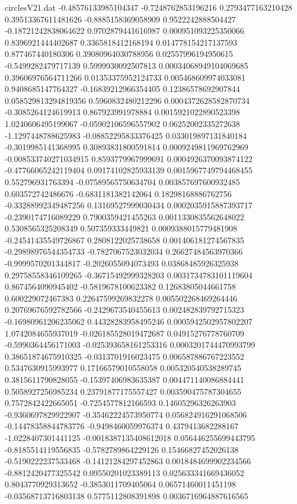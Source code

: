\begin{filecontents}{circlesV21.dat}
-0.48576133985104347	-0.7248762853196216	0.2793477163210428
0.39513367611481626	-0.8885158369058909	0.9522242888504427
-0.18721242838064622	0.9702879441616987	0.000951093225350066
0.8396921444402687	0.3365818412168194	0.014778154217137593
0.877467440180306	0.39080964030788956	0.02557996194950615
-0.5499282479717139	0.5999930092507813	0.00034068949104069685
0.39606976564711266	0.01353375952124733	0.005468609974033081
0.9408685147764327	-0.16839212966354405	0.12386578692907844
0.058529813294819356	0.5960832480212296	0.0004372628582870734
-0.3085264124619913	0.867923991978884	0.0015921022890523398
1.0240606495199067	-0.05902106596557902	0.06252002335272638
-1.1297448788625983	-0.08852295833376425	0.033019897131840184
-0.3019985141368995	0.30893831800591814	0.0009249811969762969
-0.008533740271034915	0.8593779967999691	0.0004926370093874122
-0.47766065242119404	0.09174102825933139	0.0015967749794468455
0.552796931763394	-0.07589565750634704	0.003857697600932485
0.603572742486676	-0.6831181382142064	0.18298168886762756
-0.33288992349487256	0.13169527999030434	0.0002035915887393717
-0.2390174716089229	0.7900359421455263	0.0011330835562648022
0.5308565325208349	0.507359333449821	0.0009388015779481908
-0.24541435549726867	0.2808122025738658	0.001406181274567835
-0.29898976544354733	-0.7827067523032034	0.26627484563970366
-0.9999570201344817	-0.2026055094073493	0.03868485926325938
0.29758558346109265	-0.36715492999328203	0.0031734783101119604
0.8674564090945402	-0.5819678100623382	0.12683805044661758
0.600229072467383	0.22647599269832278	0.005502268469264446
0.20769676592782566	-0.2429673540455613	0.002482839792715323
-0.16980961206235062	0.44328283958495246	0.0005942502957802207
1.0742084655937019	-0.026185528019472687	0.04915276778760709
-0.5990364456171003	-0.025393658161253316	0.0003201744470993799
0.38651874675910325	-0.0313701916023475	0.006587886767223552
0.5347630915993977	0.17166579010558058	0.005320540538289745
0.3815611790828055	-0.15397406983635387	0.004471140086884441
0.5058927256985234	0.23791877175557427	0.003590475787304655
0.7572842422665051	-0.7254577812166593	0.14605296326263903
-0.9360697829922907	-0.35462224573950774	0.056824916291068506
-0.14478358844783776	-0.9498460059976374	0.4379413682288167
-1.0228407301441125	-0.0018387135408612018	0.056446255699443795
-0.8185514119556835	-0.5782789864229126	0.15466827452026138
-0.5190222237533468	-0.14121284297452863	0.0018484699902234566
-0.8812420477325542	0.09550201023389113	0.025633341669436052
0.8043770929313652	-0.3853011709405064	0.06571460011451198
-0.03568713716803138	0.5775112808391898	0.0036716964887616565

\end{filecontents}
